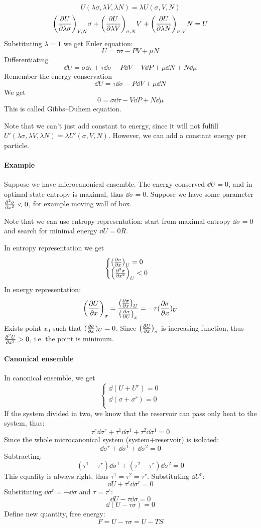 $$U(\lambda \sigma, \lambda V, \lambda N) = \lambda U (\sigma,  V,  N) $$
$$\qty(\pdv{U}{\lambda \sigma})_{V, N} \sigma + \qty(\pdv{U}{\lambda V})_{\sigma, N} V + \qty(\pdv{U}{\lambda N})_{\sigma, V} N  =U$$
Substituting $\lambda=1$ we get Euler equation:
$$U = \tau \sigma - PV + \mu N $$
Differentiating
$$\dd{U} = \sigma \dd{\tau} + \tau \dd{\sigma} -P\dd{V} -V\dd{P} + \mu \dd{N} + N\dd{\mu}$$
Remember the energy conservation
$$\dd{U} = \tau \dd{\sigma} - P \dd{V} + \mu\dd{N}$$
We get
$$0 = \sigma \dd{\tau} - V\dd{P} + N \dd{\mu}$$
This is called Gibbs–Duhem equation.

Note that we can't just add constant to energy, since it will not fulfill $U'(\lambda\sigma, \lambda V, \lambda N) = \lambda U'(\sigma, V, N)$. However, we can add a constant energy per particle.

\paragraph{Example}
Suppose we have microcanonical ensemble. The energy conserved $\dd{U} = 0$, and in optimal state entropy is maximal, thus $\dd{\sigma}=0$. Suppose we have some parameter $\pdv[2]{\sigma}{x} < 0$, for example moving wall of box.

Note that we can use entropy representation: start from maximal entropy $\dd{\sigma}=0$ and search for minimal energy $\dd{U}=0R$.

In entropy representation we get
$$\begin{cases}
\qty(\pdv{\sigma}{x})_U = 0\\
\qty(\pdv[2]{\sigma}{x})_U < 0\\
\end{cases}$$
In energy representation:
$$\qty(\pdv{U}{x})_\sigma = \frac{\qty(\pdv{\sigma}{x})_U}{\qty(\pdv{\sigma}{U})_x} = -\tau (\pdv{\sigma}{x})_U$$
Exists point $x_0$ such that $(\pdv{\sigma}{x})_U=0$. Since $\qty(\pdv{U}{x})_\sigma$ is increasing function, thus $\pdv[2]{U}{x}>0$, i.e. the point is minimum.

\paragraph{Canonical ensemble}
In canonical ensemble, we get
$$\begin{cases}
\dd{(U+U^r)} = 0\\
\dd{(\sigma+\sigma^r)} = 0\\
\end{cases}$$
If the system divided in two, we know that the reservoir can pass only heat to the system, thus:
$$\tau^r \dd{\sigma^r}+\tau^1 \dd{\sigma^1}+\tau^2 \dd{\sigma^1}=0$$
Since the whole microcanonical system (system+reservoir) is isolated:
$$\dd{\sigma^r}+\dd{\sigma^1}+ \dd{\sigma^2}=0$$
Subtracting:
$$(\tau^1-\tau^r) \dd{\sigma^1}+(\tau^2-\tau^r) \dd{\sigma^2}=0$$
This equality is always right, thus $\tau^1=\tau^2=\tau^r$.
Substituting $\dd{U^r}$:
$$\dd{U} + \tau^{r} \dd{\sigma^r} = 0$$
Substituting $\dd{\sigma^r} = -\dd{\sigma}$ and $\tau=\tau^r$:
$$\dd{U} - \tau \dd{\sigma} = 0$$ 
$$\dd{(U -\tau\sigma)}  = 0$$ 
Define new quantity, free energy:
$$F = U - \tau \sigma = U - TS$$


